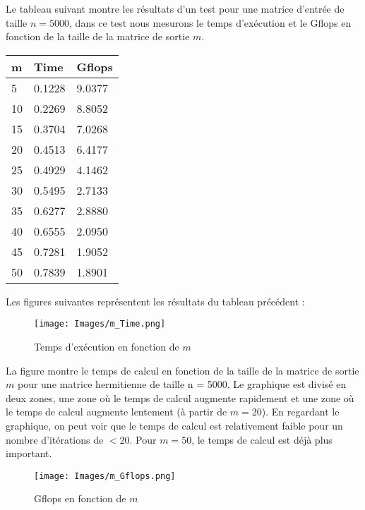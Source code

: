 \documentclass[11pt,french]{article}
\begin{document}
    Le tableau suivant montre les résultats d'un test pour une matrice d'entrée de taille $n=5000$, dans ce test nous mesurons le temps d'exécution et le Gflops en fonction de la taille de la matrice de sortie $m$.
    \begin{table}[htbp]

    \centering
    \begin{tabular}{ |p{3cm}|p{3cm}|p{3cm}|  }
    \hline
    m & Time & Gflops \\
    \hline
    5   &  0.1228   &  9.0377\\
    10   &  0.2269  &   8.8052\\
    15   &  0.3704  &   7.0268\\
    20   &  0.4513  &   6.4177\\
    25   &  0.4929  &   4.1462\\
    30   &  0.5495  &   2.7133\\
    35  &   0.6277  &   2.8880\\
    40   &  0.6555  &   2.0950\\
    45    & 0.7281  &   1.9052\\
    50   & 0.7839  &   1.8901\\
    \hline
    \end{tabular}
    \end{table}

    Les figures suivantes représentent les résultats du tableau précédent :
    \begin{figure}[h]
    \centering
    \texttt{[image: Images/m\_Time.png]}
    \caption{Temps d'exécution en fonction de $m$}
    \label{fig:mesh1}
    \end{figure}
    \FloatBarrier
    
    La figure montre le temps de calcul en fonction de la taille de la matrice de sortie $m$ pour une matrice hermitienne de taille n = 5000. Le graphique est divisé en deux zones, une zone où le temps de calcul augmente rapidement et une zone où le temps de calcul augmente lentement (à partir de $m=20$).
    En regardant le graphique, on peut voir que le temps de calcul est relativement faible pour un nombre d'itérations de $<20$. Pour $m=50$, le temps de calcul est déjà plus important. 
    \begin{figure}[h]
    \centering
    \texttt{[image: Images/m\_Gflops.png]}
    \caption{Gflops en fonction de $m$}
    \label{fig:mesh1}
    \end{figure}
    \FloatBarrier
    
\end{document}
